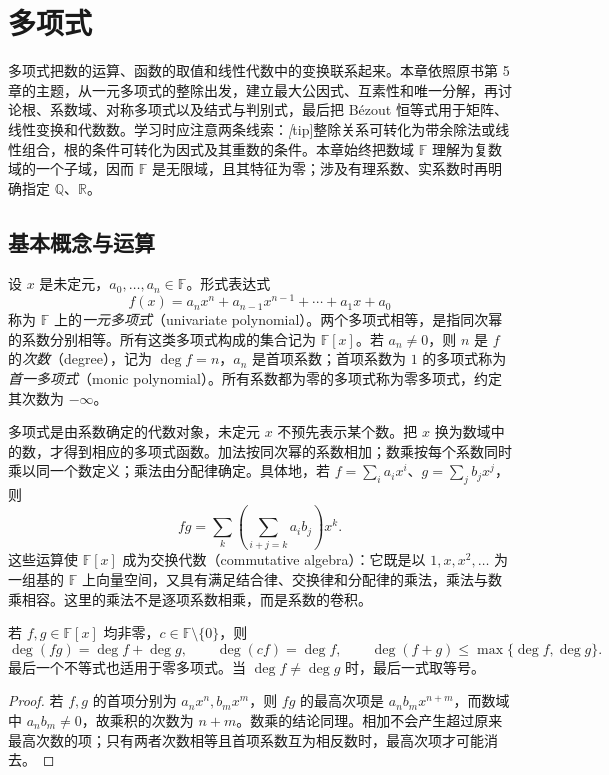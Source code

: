 \setcounter{chapter}{4} %
\chapter{多项式}
\label{chap:polynomials}

多项式把数的运算、函数的取值和线性代数中的变换联系起来。本章依照原书第 5 章的主题，从一元多项式的整除出发，建立最大公因式、互素性和唯一分解，再讨论根、系数域、对称多项式以及结式与判别式，最后把 Bézout 恒等式用于矩阵、线性变换和代数数。学习时应注意两条线索：\emph[tip]{整除关系可转化为带余除法或线性组合，根的条件可转化为因式及其重数的条件}。本章始终把数域 $\mathbb F$ 理解为复数域的一个子域，因而 $\mathbb F$ 是无限域，且其特征为零；涉及有理系数、实系数时再明确指定 $\mathbb Q$、$\mathbb R$。

\section{基本概念与运算}
\label{sec:poly-basic}

\begin{definition}
\label{def:poly-formal}
设 $x$ 是未定元，$a_0,\ldots,a_n\in\mathbb F$。形式表达式
\[
    f(x)=a_nx^n+a_{n-1}x^{n-1}+\cdots+a_1x+a_0
\]
称为 $\mathbb F$ 上的\emph{一元多项式}（univariate polynomial）。两个多项式相等，是指同次幂的系数分别相等。所有这类多项式构成的集合记为 $\mathbb F[x]$。若 $a_n\ne0$，则 $n$ 是 $f$ 的\emph{次数}（degree），记为 $\deg f=n$，$a_n$ 是首项系数；首项系数为 $1$ 的多项式称为\emph{首一多项式}（monic polynomial）。所有系数都为零的多项式称为零多项式，约定其次数为 $-\infty$。
\end{definition}

多项式是由系数确定的代数对象，未定元 $x$ 不预先表示某个数。把 $x$ 换为数域中的数，才得到相应的多项式函数。加法按同次幂的系数相加；数乘按每个系数同时乘以同一个数定义；乘法由分配律确定。具体地，若 $f=\sum_i a_ix^i$、$g=\sum_j b_jx^j$，则
\[
    fg=\sum_k\left(\sum_{i+j=k}a_ib_j\right)x^k.
\]
这些运算使 $\mathbb F[x]$ 成为交换代数（commutative algebra）：它既是以 $1,x,x^2,\ldots$ 为一组基的 $\mathbb F$ 上向量空间，又具有满足结合律、交换律和分配律的乘法，乘法与数乘相容。这里的乘法不是逐项系数相乘，而是系数的卷积。

\begin{proposition}
\label{prop:poly-degree}
若 $f,g\in\mathbb F[x]$ 均非零，$c\in\mathbb F\setminus\{0\}$，则
\[
    \deg(fg)=\deg f+\deg g,\qquad \deg(cf)=\deg f,
    \qquad \deg(f+g)\leq\max\{\deg f,\deg g\}.
\]
最后一个不等式也适用于零多项式。当 $\deg f\ne\deg g$ 时，最后一式取等号。
\end{proposition}
\begin{proof}
若 $f,g$ 的首项分别为 $a_nx^n,b_mx^m$，则 $fg$ 的最高次项是 $a_nb_mx^{n+m}$，而数域中 $a_nb_m\ne0$，故乘积的次数为 $n+m$。数乘的结论同理。相加不会产生超过原来最高次数的项；只有两者次数相等且首项系数互为相反数时，最高次项才可能消去。
\end{proof}

